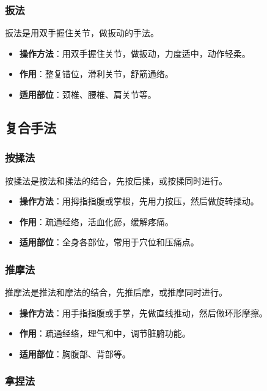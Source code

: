 \documentclass[12pt,UTF8]{ctexbook}
\begin{document}
\subsubsection{扳法}

扳法是用双手握住关节，做扳动的手法。

\begin{itemize}
\item \textbf{操作方法}：用双手握住关节，做扳动，力度适中，动作轻柔。
\item \textbf{作用}：整复错位，滑利关节，舒筋通络。
\item \textbf{适用部位}：颈椎、腰椎、肩关节等。
\end{itemize}

\subsection{复合手法}

\subsubsection{按揉法}

按揉法是按法和揉法的结合，先按后揉，或按揉同时进行。

\begin{itemize}
\item \textbf{操作方法}：用拇指指腹或掌根，先用力按压，然后做旋转揉动。
\item \textbf{作用}：疏通经络，活血化瘀，缓解疼痛。
\item \textbf{适用部位}：全身各部位，常用于穴位和压痛点。
\end{itemize}

\subsubsection{推摩法}

推摩法是推法和摩法的结合，先推后摩，或推摩同时进行。

\begin{itemize}
\item \textbf{操作方法}：用手指指腹或手掌，先做直线推动，然后做环形摩擦。
\item \textbf{作用}：疏通经络，理气和中，调节脏腑功能。
\item \textbf{适用部位}：胸腹部、背部等。
\end{itemize}

\subsubsection{拿捏法}
\end{document}
